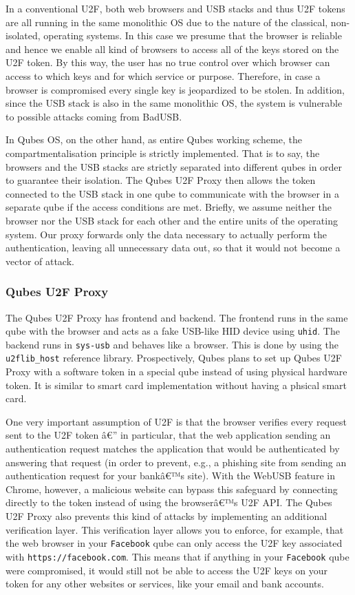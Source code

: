 \documentclass[runningheads,a4paper]{article}
\begin{document}
In a conventional U2F, both web browsers and
USB stacks and thus U2F tokens are all running in the same monolithic
OS due to the nature of the classical, non-isolated, operating
systems. In this case we presume that the browser is reliable and
hence we enable all kind of browsers to access all of the keys stored
on the U2F token. By this way, the user has no true control over which
browser can access to which keys and for which service or
purpose. Therefore, in case a browser is compromised every single key
is jeopardized to be stolen. In addition, since the USB stack is also
in the same monolithic OS, the system is vulnerable to possible
attacks coming from BadUSB.

In Qubes OS, on the other hand, as entire Qubes working scheme, the
compartmentalisation principle is strictly implemented. That is to
say, the browsers and the USB stacks are strictly separated into
different qubes in order to guarantee their isolation.  The Qubes U2F
Proxy then allows the token connected to the USB stack in one qube to
communicate with the browser in a separate qube if the access
conditions are met. Briefly, we assume neither the browser nor the USB
stack for each other and the entire units of the operating system. Our
proxy forwards only the data necessary to actually perform the
authentication, leaving all unnecessary data out, so that it would not
become a vector of attack.

\subsubsection{Qubes U2F Proxy} 

The Qubes U2F Proxy has frontend and
backend. The frontend runs in the same qube with the browser and acts
as a fake USB-like HID device using \texttt{uhid}. The backend runs in
\texttt{sys-usb} and behaves like a browser. This is done by using the
\texttt{u2flib\_host} reference library. Prospectively, Qubes plans to
set up Qubes U2F Proxy with a software token in a special qube instead
of using physical hardware token. It is similar to smart card
implementation without having a phsical smart card.

One very important assumption of U2F is that the browser verifies
every request sent to the U2F token â€” in particular, that the web
application sending an authentication request matches the application
that would be authenticated by answering that request (in order to
prevent, e.g., a phishing site from sending an authentication request
for your bankâ€™s site). With the WebUSB feature in Chrome, however, a
malicious website can bypass this safeguard by connecting directly to
the token instead of using the browserâ€™s U2F API.  The Qubes U2F
Proxy also prevents this kind of attacks by implementing an additional
verification layer. This verification layer allows you to enforce, for
example, that the web browser in your \texttt{Facebook} qube can only
access the U2F key associated with \texttt{https://facebook.com}. This
means that if anything in your \texttt{Facebook} qube were
compromised, it would still not be able to access the U2F keys on your
token for any other websites or services, like your email and bank
accounts.
\end{document}
